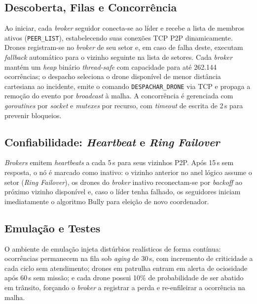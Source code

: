 \subsection{Descoberta, Filas e Concorrência}
\label{sub:descoberta_filas}

Ao iniciar, cada \textit{broker} seguidor conecta-se ao líder e recebe a lista de membros ativos (\texttt{PEER\_LIST}), estabelecendo suas conexões TCP P2P dinamicamente. Drones registram-se no \textit{broker} de seu setor e, em caso de falha deste, executam \textit{fallback} automático para o vizinho seguinte na lista de setores. Cada \textit{broker} mantém um \textit{heap} binário \textit{thread-safe} com capacidade para até 262.144 ocorrências; o despacho seleciona o drone disponível de menor distância cartesiana ao incidente, emite o comando \texttt{DESPACHAR\_DRONE} via TCP e propaga a remoção do evento por \textit{broadcast} à malha. A concorrência é gerenciada com \textit{goroutines} por \textit{socket} e \textit{mutexes} por recurso, com \textit{timeout} de escrita de 2\,s para prevenir bloqueios.

\subsection{Confiabilidade: \textit{Heartbeat} e \textit{Ring Failover}}
\label{sub:confiabilidade}

\textit{Brokers} emitem \textit{heartbeats} a cada 5\,s para seus vizinhos P2P. Após 15\,s sem resposta, o nó é marcado como inativo: o vizinho anterior no anel lógico assume o setor (\textit{Ring Failover}), os drones do \textit{broker} inativo reconectam-se por \textit{backoff} ao próximo vizinho disponível e, caso o líder tenha falhado, os seguidores iniciam imediatamente o algoritmo Bully para eleição de novo coordenador.

\subsection{Emulação e Testes}
\label{sub:emulacao}

O ambiente de emulação injeta distúrbios realísticos de forma contínua: ocorrências permanecem na fila sob \textit{aging} de 30\,s, com incremento de criticidade a cada ciclo sem atendimento; drones em patrulha entram em alerta de ociosidade após 60\,s sem missão; e cada drone possui 10\% de probabilidade de ser abatido em trânsito, forçando o \textit{broker} a registrar a perda e re-enfileirar a ocorrência na malha.
